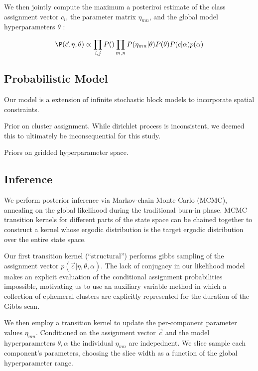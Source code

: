 \documentclass{article}
\begin{document}
We then jointly compute the maximum a posteriroi estimate of the class
assignment vector ${c_i}$, the parameter matrix $\eta_{mn}$, and the
global model hyperparameters $\theta$ :

\begin{equation}
  \P(\vec{c}, \eta, \theta) \propto \prod_{i, j} P() \prod_{m, n} P(\eta_{mn} | \theta)  P(\theta) P(c | \alpha) p(\alpha) 
\end{equation}



\subsection{Probabilistic Model}

Our model is a extension of  infinite stochastic block models \cite{Kemp, other guys} to incorporate spatial constraints. 

Prior on cluster assignment. While dirichlet process is inconsistent, we deemed this to ultimately be inconsequential for this study. 


Priors on gridded hyperparameter space. 


\subsection{Inference} 
We perform posterior inference via Markov-chain Monte Carlo (MCMC),
annealing on the global likelihood during the traditional burn-in
phase. MCMC transition kernels for different parts of the state space
can be chained together to construct a kernel whose ergodic
distribution is the target ergodic distribution over the entire state space. 

Our first transition kernel (``structural'') performs gibbs sampling 
of the assignment vector $p(\vec{c} | \eta, \theta, \alpha)$. 
The lack of conjugacy in our likelihood model makes an explicit 
evaluation of the conditional assignment probabilities impossible, 
motivating us to use an auxiliary variable method \autocite{Neal}
in which a collection of ephemeral clusters are explicitly represented
for the duration of the Gibbs scan. 

We then employ a transition kernel to update the per-component
parameter values $\eta_{mn}$. Conditioned on the assignment vector
$\vec{c}$ and the model hyperparameters $\theta, \alpha$ the 
individual $\eta_{mn}$ are indepednent. We slice sample \autocite{neal}
each component's parameters, choosing the slice width as a function
of the global hyperparameter range. 
\end{document}
